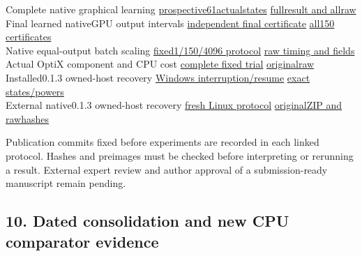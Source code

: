 \documentclass[
  10pt,
]{article}
\begin{document}
Complete native graphical learning \textbar{}
\href{../NATIVE_DEFERRED_GRAPHICS_TRAINING_PROTOCOL_2026-10-09.md}{prospective61actualstates}
\textbar{}
\href{../validation/native-deferred-training-2026-10-09/attempt01/evidence_index.json}{fullresult
and allraw} \textbar{}\\
Final learned nativeGPU output intervals \textbar{}
\href{../NATIVE_DEFERRED_TRAINING_FIELD_CERTIFICATE_PROTOCOL_2026-10-09.md}{independent
final certificate} \textbar{}
\href{../validation/native-deferred-training-certificate-2026-10-09/attempt01/worker/certificate.json}{all150
certificates} \textbar{}\\
Native equal-output batch scaling \textbar{}
\href{../NATIVE_GRAPHICS_SCALING_PROTOCOL_2026-10-09.md}{fixed1/150/4096
protocol} \textbar{}
\href{../validation/native-graphics-scaling-2026-10-09/attempt02/evidence_index.json}{raw
timing and fields} \textbar{}\\
Actual OptiX component and CPU cost \textbar{}
\href{../NATIVE_CYCLES_OPTIX_COMPONENT_V2_PROTOCOL_2026-10-09.md}{complete
fixed trial} \textbar{}
\href{../validation/native-cycles-optix-2026-10-09/attempt02/evidence_index.json}{originalraw}
\textbar{}\\
Installed0.1.3 owned-host recovery \textbar{}
\href{../INSTALLED_BLENDER_HOST_RECOVERY_PROTOCOL_2026-10-09.md}{Windows
interruption/resume} \textbar{}
\href{../validation/installed-blender-host-recovery-2026-10-09/attempt01/evidence_index.json}{exact
states/powers} \textbar{}\\
External native0.1.3 owned-host recovery \textbar{}
\href{../EXTERNAL_INSTALLED_BLENDER_RECOVERY_PROTOCOL_2026-10-09.md}{fresh
Linux protocol} \textbar{}
\href{../validation/external-installed-blender-recovery-2026-10-09/attempt01/evidence_index.json}{originalZIP
and rawhashes} \textbar{}

Publication commits fixed before experiments are recorded in each linked
protocol. Hashes and preimages must be checked before interpreting or
rerunning a result. External expert review and author approval of a
submission-ready manuscript remain pending.

\hypertarget{dated-consolidation-and-new-cpu-comparator-evidence}{%
\subsection{10. Dated consolidation and new CPU comparator
evidence}\label{dated-consolidation-and-new-cpu-comparator-evidence}}
\end{document}
